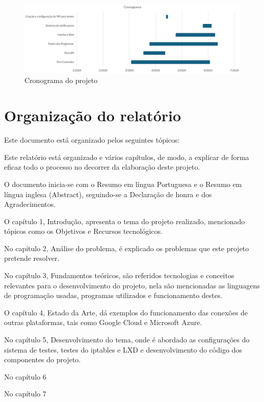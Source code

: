 \begin{figure}[H]
\begin{center}
\includegraphics[width=16cm]{figs/cronograma.png}
\caption{Cronograma do projeto}
\label{fig:bookstack}
\end{center}
\end{figure}


\section{Organização do relatório}
\label{sec:intro_struct}

Este documento está organizado pelos seguintes tópicos:

Este relatório está organizado e vários capítulos, de modo, a explicar de forma
eficaz todo o processo no decorrer da elaboração deste projeto.

O documento inicia-se com o Resumo em língua Portuguesa e o Resumo em língua 
inglesa (Abstract), seguindo-se a Declaração de honra e dos Agradecimentos.

O capítulo 1, Introdução, apresenta o tema do projeto realizado, mencionado tópicos
como os Objetivos e Recursos tecnológicos.

No capítulo 2, Análise do problema, é explicado os problemas que este projeto 
pretende resolver.

No capítulo 3, Fundamentos teóricos, são referidos tecnologias e conceitos relevantes 
para o desenvolvimento do projeto, nela são mencionadas as linguagens de programação usadas,
programas utilizados e funcionamento destes.

O capítulo 4, Estado da Arte, dá exemplos do funcionamento das conexões de outras 
plataformas, tais como Google Cloud e Microsoft Azure.

No capítulo 5, Desenvolvimento do tema, onde é abordado as configurações do sistema
de testes, testes do iptables e LXD e desenvolvimento do código dos componentes do projeto.


No capítulo 6

No capítulo 7


